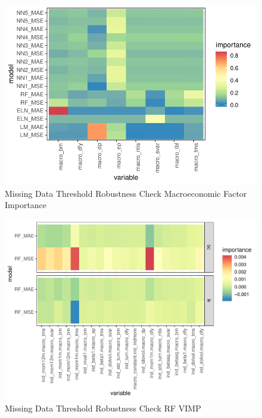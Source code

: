 \documentclass{article}
\begin{document}
\begin{figure}
	\includegraphics[]{../../Results/empirical_missing_threshold/empirical_sample_all_vi_macro.pdf}
	\caption{Missing Data Threshold Robustness Check Macroeconomic Factor Importance}
\end{figure}


\begin{figure}
	\includegraphics[]{../../Results/empirical_missing_threshold/empirical_vimp.pdf}
	\caption{Missing Data Threshold Robustness Check RF VIMP}
\end{figure}

\end{document}
